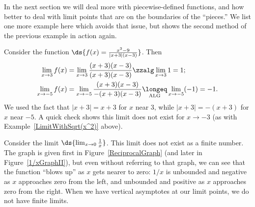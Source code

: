 
In the next section we will deal more with piecewise-defined functions,
and how better to deal with limit points that are on the boundaries
of the ``pieces.'' We list one more example here which avoids that
issue, but shows the second method of the previous example in action
again.


\bex Consider the function $\ds{f(x)=\frac{x^2-9}{|x+3|(x-3)}}$.
Then
\begin{align*}
\lim_{x\to3}f(x)&=\lim_{x\to3}\frac{(x+3)(x-3)}{(x+3)(x-3)}
                     \zzalg\lim_{x\to3}1=1;\\
\lim_{x\to-5}f(x)&=\lim_{x\to-5}\frac{(x+3)(x-3)}{-(x+3)(x-3)}
                     \underset{\text{\rm ALG}}{\longeq}\lim_{x\to-5}(-1)=-1.
\end{align*}
We used the fact that $|x+3|=x+3$ for $x$ near $3$, while 
$|x+3|=-(x+3)$ for $x$ near $-5$.  A quick check shows this
limit does not exist for $x\to-3$ (as with Example~\ref{LimitWithSqrt(x^2)}
above).
\eex

\bex Consider the limit $\ds{\lim_{x\to0}\frac1x}$.
This limit does not exist as a finite number. 
The graph is given first in Figure~\ref{ReciprocalGraph}
(and later in Figure~\ref{1/xGraphII}),
but even without referring to that graph, we can see
that the function ``blows up'' as $x$ gets nearer to
zero:  $1/x$ is unbounded and negative as $x$ approaches
zero from the left, and unbounded and positive as
$x$ approaches zero from the right.  When we have
vertical asymptotes at our limit points, 
we do not have finite limits.\footnotemark
\eex

